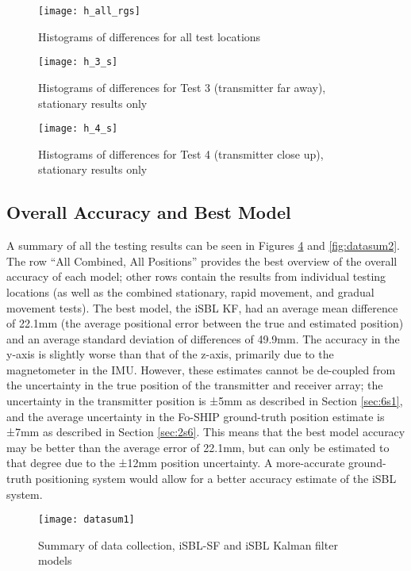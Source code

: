 \documentclass[12pt,a4paper]{report}
\begin{document}
\begin{figure}[htbp]
	\centering
	\texttt{[image: h\_all\_rgs]}
	\caption{Histograms of differences for all test locations}
	\label{fig:h_all_rgs}
\end{figure}

\begin{figure}[htbp]
	\centering
	\texttt{[image: h\_3\_s]}
	\caption{Histograms of differences for Test 3 (transmitter far away), stationary results only}
	\label{fig:h_3_s}
\end{figure}

\begin{figure}[htbp]
	\centering
	\texttt{[image: h\_4\_s]}
	\caption{Histograms of differences for Test 4 (transmitter close up), stationary results only}
	\label{fig:h_4_s}
\end{figure}

\pagebreak

\subsection{Overall Accuracy and Best Model} \label{ssec:6s2s6}
A summary of all the testing results can be seen in Figures \ref{fig:datasum1} and \ref{fig:datasum2}. The row “All Combined, All Positions” provides the best overview of the overall accuracy of each model; other rows contain the results from individual testing locations (as well as the combined stationary, rapid movement, and gradual movement tests). The best model, the iSBL KF, had an average mean difference of 22.1mm (the average positional error between the true and estimated position) and an average standard deviation of differences of 49.9mm. The accuracy in the y-axis is slightly worse than that of the z-axis, primarily due to the magnetometer in the IMU. However, these estimates cannot be de-coupled from the uncertainty in the true position of the transmitter and receiver array; the uncertainty in the transmitter position is ±5mm as described in Section \ref{sec:6s1}, and the average uncertainty in the Fo-SHIP ground-truth position estimate is ±7mm as described in Section \ref{sec:2s6}. This means that the best model accuracy may be better than the average error of 22.1mm, but can only be estimated to that degree due to the ±12mm position uncertainty. A more-accurate ground-truth positioning system would allow for a better accuracy estimate of the iSBL system.

\begin{figure}[htbp]
	\centering
	\texttt{[image: datasum1]}
	\caption{Summary of data collection, iSBL-SF and iSBL Kalman filter models}
	\label{fig:datasum1}
\end{figure}
\end{document}
